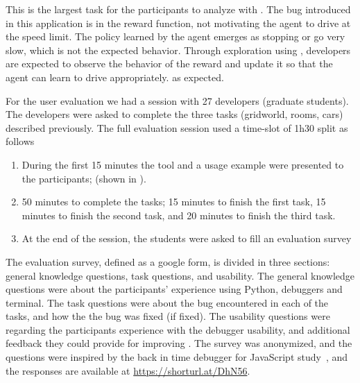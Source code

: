 This is the largest task for the participants to analyze with \flik. %
The bug introduced in this application is in the reward function, not motivating the agent to drive at the speed limit. The policy learned by the agent emerges as stopping or go very slow, which is not the expected behavior. Through exploration using \flik, developers are expected to observe the behavior of the reward and update it so that the agent can learn to drive appropriately.
as expected.


For the user evaluation we had a session with 27 developers (\ie graduate students). 
The developers were asked to complete the three tasks (\ie gridworld, rooms, cars) described previously. The full evaluation session used a time-slot of 1h30 split as follows 
\begin{enumerate}[label=(\arabic*)]
\item During the first 15 minutes the tool and a usage example were presented to the participants; (shown in ).
\item 50 minutes to complete the tasks; 15 minutes to finish the first task, 15 minutes to finish the second task, and  20 minutes to finish the third task. 
\item At the end of the session, the students were asked to fill an evaluation survey 
\end{enumerate}

The evaluation survey, defined as a google form, is divided in three sections: general knowledge questions, task questions, and usability.
The general knowledge questions were about the participants' experience  using Python, debuggers and  terminal. The task questions were about the bug encountered in each of the tasks, and how the the bug was fixed (if fixed). The usability  questions were regarding the participants experience with the debugger usability, and additional feedback they could provide for improving \flik. The survey was anonymized, and the questions were inspired by the 
back in time debugger for JavaScript study~\cite{leger23}, and the responses are available 
at \url{https://shorturl.at/DhN56}. 

